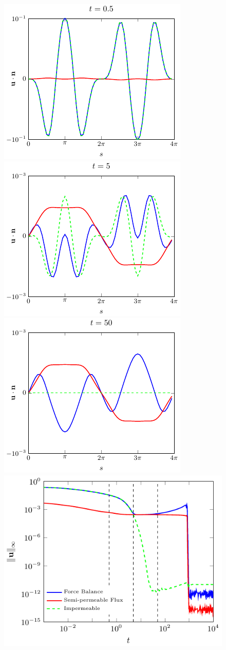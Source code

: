 \documentclass[9pt,twocolumn,twoside,lineno]{pnas-new}
\begin{document}
%  
%  
%  
%  
\begin{figure}[htp]
  \centering
%  
%  
%  
%  
  \includegraphics[width=0.48\linewidth]{figures/ellipseVelocity1.pdf}
  \includegraphics[width=0.48\linewidth]{figures/ellipseVelocity2.pdf}
  \includegraphics[width=0.48\linewidth]{figures/ellipseVelocity3.pdf}
  \includegraphics[width=0.48\linewidth]{figures/ellipseVelocityNorms.pdf}

\end{figure}
\end{document}
